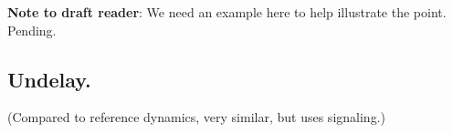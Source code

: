 \documentclass[11pt]{article}
\begin{document}
\textbf{Note to draft reader}: We need an example here to help illustrate the point. Pending.

\begin{mathpar}
\end{mathpar}

\subsection{Undelay.}

(Compared to reference dynamics, very similar, but uses signaling.)

\newpage
\end{document}
